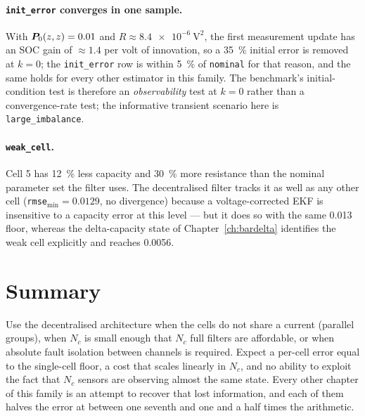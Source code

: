 \paragraph{\texttt{init\_error} converges in one sample.} With $\bm{P}_0(z,z)=\num{0.01}$ and
$R\approx\SI{8.4e-6}{\volt\squared}$, the first measurement update has an SOC gain of
$\approx\num{1.4}$ per volt of innovation, so a \SI{35}{\percent} initial error is removed at
$k=0$; the \texttt{init\_error} row is within \SI{5}{\percent} of \texttt{nominal} for that
reason, and the same holds for every other estimator in this family. The
benchmark's initial-condition test is therefore an \emph{observability} test at $k=0$ rather than
a convergence-rate test; the informative transient scenario here is \texttt{large\_imbalance}.

\paragraph{\texttt{weak\_cell}.} Cell 5 has \SI{12}{\percent} less capacity and \SI{30}{\percent}
more resistance than the nominal parameter set the filter uses. The decentralised filter tracks
it as well as any other cell (\texttt{rmse}$_{\min}=\num{0.0129}$, no divergence) because a
voltage-corrected EKF is insensitive to a capacity error at this level --- but it does so with the
same \num{0.013} floor, whereas the delta-capacity state of Chapter~\ref{ch:bardelta} identifies
the weak cell explicitly and reaches \num{0.0056}.

\section{Summary}
Use the decentralised architecture when the cells do not share a current (parallel groups), when
$N_c$ is small enough that $N_c$ full filters are affordable, or when absolute fault isolation
between channels is required. Expect a per-cell error equal to the single-cell floor, a cost that
scales linearly in $N_c$, and no ability to exploit the fact that $N_c$ sensors are observing
almost the same state. Every other chapter of this family is an attempt to recover that lost
information, and each of them halves the error at between one seventh and one and a half times
the arithmetic.
